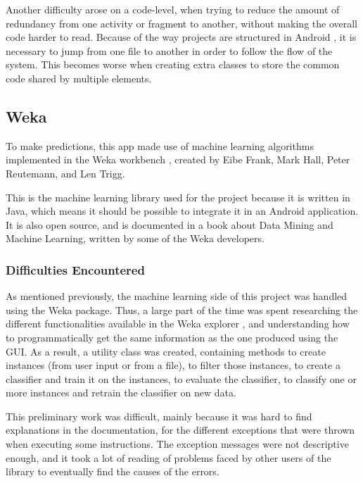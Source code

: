 \documentclass{mproj}
\begin{document}
Another difficulty arose on a code-level, when trying to reduce the amount of redundancy from one activity or fragment to another, without making the overall code harder to read. Because of the way projects are structured in Android \cite{androidprojects}, it is necessary to jump from one file to another in order to follow the flow of the system. This becomes worse when creating extra classes to store the common code shared by multiple elements.

\subsection{Weka}

To make predictions, this app made use of machine learning algorithms implemented in the Weka workbench \cite{weka}, created by Eibe Frank, Mark Hall, Peter Reutemann, and Len Trigg.

This is the machine learning library used for the project because it is written in Java, which means it should be possible to integrate it in an Android application. It is also open source, and is documented in a book about Data Mining and Machine Learning, written by some of the Weka developers. \cite{wekabook}

\subsubsection*{Difficulties Encountered}\label{wekadiff}

As mentioned previously, the machine learning side of this project was handled using the Weka package. Thus, a large part of the time was spent researching the different functionalities available in the Weka explorer \cite{wekaexplorer}, and understanding how to programmatically get the same information as the one produced using the GUI. As a result, a utility class was created, containing methods to create instances (from user input or from a file), to filter those instances, to create a classifier and train it on the instances, to evaluate the classifier, to classify one or more instances and retrain the classifier on new data. \par

This preliminary work was difficult, mainly because it was hard to find explanations in the documentation, for the different exceptions that were thrown when executing some instructions. The exception messages were not descriptive enough, and it took a lot of reading of problems faced by other users of the library to eventually find the causes of the errors. \par
\end{document}
